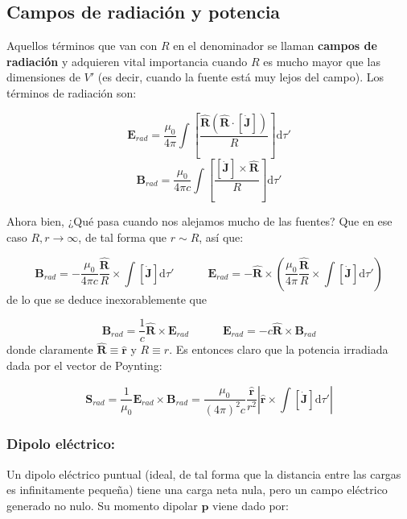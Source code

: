 \documentclass[12pt,a4paper]{article}
\newcommand{\parentesis}[1]{\left( #1  \right)}
\newcommand{\ccorchetes}[1]{\left[ #1  \right]}
\newcommand{\D}{\mathrm{d}}
\newcommand{\tquad}{\quad \quad \quad}
\newcommand{\Bn}{\mathbf{B}}
\newcommand{\En}{\mathbf{E}}
\newcommand{\Jn}{\mathbf{J}}
\newcommand{\pn}{\mathbf{p}}
\newcommand{\Sn}{\mathbf{S}}
\newcommand{\hnr}{\hat{\mathbf{r}}}
\newcommand{\hnR}{\hat{\mathbf{R}}}
\numberwithin{equation}{section}
\numberwithin{figure}{section}
\begin{document}
\subsection{Campos de radiación y potencia}
Aquellos términos que van con $R$ en el denominador se llaman \textbf{campos de radiación} y adquieren vital importancia cuando $R$ es mucho mayor que las dimensiones de $V'$ (es decir, cuando la fuente está muy lejos del campo). Los términos de radiación son:

\begin{equation}
\En_{rad} =  \dfrac{\mu_0}{4 \pi} \int \ccorchetes{\dfrac{\hnR (\hnR \cdot [\dot{\Jn}])}{R} } \D \tau'
\end{equation}
\begin{equation}
\Bn_{rad} = \dfrac{\mu_0}{4 \pi c} \int \ccorchetes{\dfrac{[\dot{\Jn}] \times \hnR}{R}} \D \tau'
\end{equation}

Ahora bien, ¿Qué pasa cuando nos alejamos mucho de las fuentes? Que en ese caso $R,r \rightarrow \infty$, de tal forma que $r \sim R$, así que:

\begin{equation}
\Bn_{rad} = - \dfrac{\mu_0}{4 \pi c} \dfrac{\hnR}{R} \times \int [\dot{\Jn}] \D \tau' \tquad \En_{rad} = - \hnR \times \parentesis{\dfrac{\mu_0}{4 \pi } \dfrac{\hnR}{R} \times \int [\dot{\Jn}] \D \tau' }
\end{equation}
de lo que se deduce inexorablemente que

\begin{equation}
\Bn_{rad} = \dfrac{1}{c} \hnR \times \En_{rad} \tquad \En_{rad} = - c \hnR \times \Bn_{rad} \label{Ec:07.4.0.18}
\end{equation}
donde claramente $\hnR \equiv \hnr$ y $R \equiv r$. Es entonces claro que la potencia irradiada dada por el vector de Poynting:

\begin{equation}
\Sn_{rad} = \dfrac{1}{\mu_0} \En_{rad} \times \Bn_{rad} = \dfrac{\mu_0}{(4\pi)^2c} \dfrac{\hnr}{r^2} \left| \hnr \times \int [\dot{\Jn}] \D \tau' \right|
\end{equation}

\subsubsection{Dipolo eléctrico:}

Un dipolo eléctrico puntual (ideal, de tal forma que la distancia entre las cargas es infinitamente pequeña) tiene una carga neta nula, pero un campo eléctrico generado no nulo. Su momento dipolar $\pn$ viene dado por:
\end{document}
